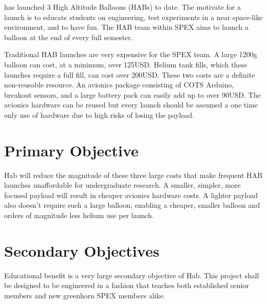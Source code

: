 \documentclass[conference]{IEEEtran} %
\begin{document}
 has launched 3 High Altitude Balloons (HABs) to date.  The
motivate for a launch is to educate students on engineering, test experiments in
a near space-like environment, and to have fun. The HAB team within SPEX aims to
launch a balloon at the end of every full semester.

Traditional HAB launches are very expensive for the SPEX team.
A large 1200g balloon can cost, at a minimum, over 125USD.  Helium tank fills,
which these launches require a full fill, can cost over 200USD. These two costs
are a definite non-reusable resource. An avionics package consisting of COTS
Arduino, breakout sensors, and a large battery pack can easily add up to over
90USD. The avionics hardware can be reused but every launch should be assumed a
one time only use of hardware due to high risks of losing the payload.


\section{Primary Objective}
\label{sec:primary-obj}
\textmu{}Hab will reduce the magnitude of these three large costs that make frequent HAB
launches unaffordable for undergraduate research. A smaller, simpler, more
focused payload will result in cheaper avionics hardware costs. A lighter
payload also doesn't require such a large balloon, enabling a cheaper, smaller
balloon and orders of magnitude less helium use per launch.

\section{Secondary Objectives}
\label{sec:secondary-obj}
Educational benefit is a very large secondary objective of \textmu{}Hab.  This
project shall be designed to be engineered in a fashion that teaches both
established senior members and new greenhorn SPEX members alike.
\end{document}
